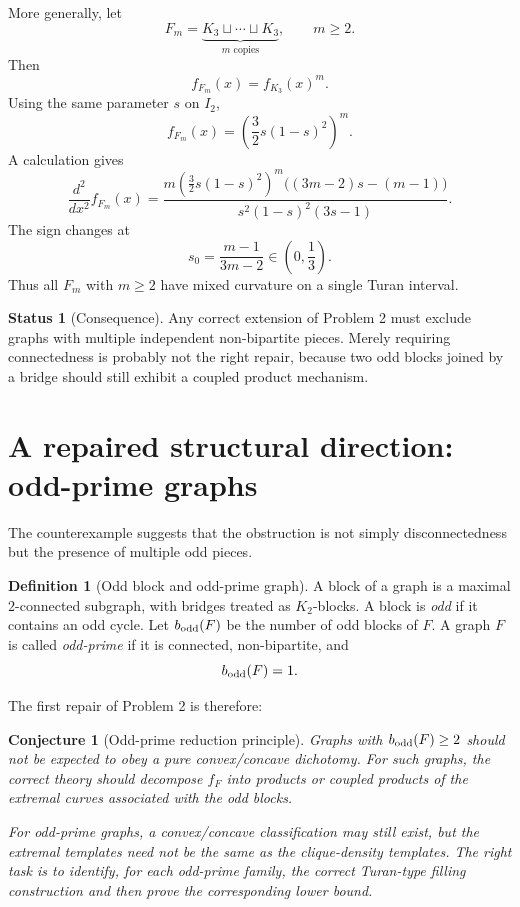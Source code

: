 \documentclass[11pt]{amsart}
\newtheorem{conjecture}[theorem]{Conjecture}
\theoremstyle{definition}
\newtheorem{definition}[theorem]{Definition}
\newtheorem{status}[theorem]{Status}
\newcommand{\1}{\mathbf 1}
\begin{document}
More generally, let
\[
   F_m=\underbrace{K_3\sqcup\cdots\sqcup K_3}_{m\text{ copies}},\qquad m\ge 2.
\]
Then
\[
   f_{F_m}(x)=f_{K_3}(x)^m.
\]
Using the same parameter $s$ on $I_2$,
\[
   f_{F_m}(x)=\left(\frac32s(1-s)^2\right)^m.
\]
A calculation gives
\[
   \frac{d^2}{dx^2}f_{F_m}(x)
   =
   \frac{m\left(\frac32s(1-s)^2\right)^m
     \bigl((3m-2)s-(m-1)\bigr)}
        {s^2(1-s)^2(3s-1)}.
\]
The sign changes at
\[
   s_0=\frac{m-1}{3m-2}\in\left(0,\frac13\right).
\]
Thus all $F_m$ with $m\ge 2$ have mixed curvature on a single Turan interval.

\begin{status}[Consequence]
Any correct extension of Problem 2 must exclude graphs with multiple independent non-bipartite pieces.  Merely requiring connectedness is probably not the right repair, because two odd blocks joined by a bridge should still exhibit a coupled product mechanism.
\end{status}

\section{A repaired structural direction: odd-prime graphs}

The counterexample suggests that the obstruction is not simply disconnectedness but the presence of multiple odd pieces.

\begin{definition}[Odd block and odd-prime graph]
A block of a graph is a maximal $2$-connected subgraph, with bridges treated as $K_2$-blocks.  A block is \emph{odd} if it contains an odd cycle.  Let $b_{\rm odd}(F)$ be the number of odd blocks of $F$.  A graph $F$ is called \emph{odd-prime} if it is connected, non-bipartite, and
\[
   b_{\rm odd}(F)=1.
\]
\end{definition}

The first repair of Problem 2 is therefore:

\begin{conjecture}[Odd-prime reduction principle]
Graphs with $b_{\rm odd}(F)\ge 2$ should not be expected to obey a pure convex/concave dichotomy.  For such graphs, the correct theory should decompose $f_F$ into products or coupled products of the extremal curves associated with the odd blocks.

For odd-prime graphs, a convex/concave classification may still exist, but the extremal templates need not be the same as the clique-density templates.  The right task is to identify, for each odd-prime family, the correct Turan-type filling construction and then prove the corresponding lower bound.
\end{conjecture}
\end{document}

